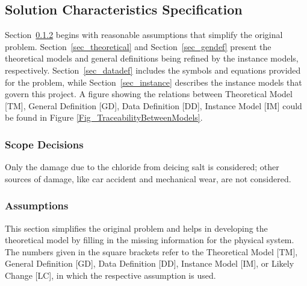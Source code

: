 \documentclass[12pt]{article}
\begin{document}
\subsection{Solution Characteristics Specification}
Section~\ref{sec_assumpt} begins with reasonable assumptions that simplify the original problem. Section~\ref{sec_theoretical} and Section~\ref{sec_gendef} present the theoretical models and general definitions being refined by the instance models, respectively. Section~\ref{sec_datadef} includes the symbols and equations provided for the problem, while Section~\ref{sec_instance} describes the instance models that govern this project. A figure showing the relations between Theoretical Model [TM], General Definition [GD], Data Definition [DD], Instance Model [IM] could be found in Figure \ref{Fig_TraceabilityBetweenModels}.

\subsubsection{Scope Decisions}
Only the damage due to the chloride from deicing salt is considered; other sources of damage, like car accident and mechanical wear, are not considered.

\subsubsection{Assumptions} \label{sec_assumpt}

This section simplifies the original problem and helps in developing the
theoretical model by filling in the missing information for the physical system.
The numbers given in the square brackets refer to the Theoretical Model [TM],
General Definition [GD], Data Definition [DD], Instance Model [IM], or Likely
Change [LC], in which the respective assumption is used.
\end{document}
